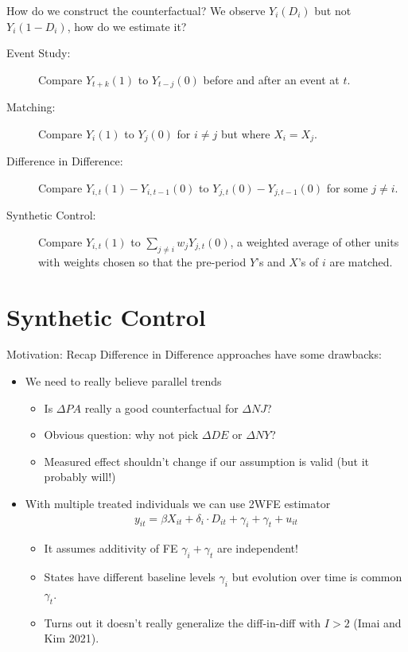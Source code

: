 \documentclass[aspectratio=169,11pt]{beamer}
\begin{document}
\begin{frame}{How do we construct the counterfactual?}
We observe $Y_i(D_i)$ but not $Y_i(1-D_i)$, how do we estimate it?\\

\begin{description}
  \item [Event Study:] Compare $Y_{t+k}(1)$ to $Y_{t-j}(0)$ before and after an event at $t$.
  \item [Matching:] Compare $Y_i(1)$ to $Y_j(0)$ for $i \neq j$ but where $X_i = X_j$.
  \item [Difference in Difference:] Compare $Y_{i,t}(1)-Y_{i,t-1}(0)$ to $Y_{j,t}(0)-Y_{j,t-1}(0)$  for some $j \neq i$.
  \item [\alert{Synthetic Control:}] Compare $Y_{i,t}(1)$ to $\sum_{j \neq i} w_j Y_{j,t}(0)$, a weighted average of other units with weights chosen so that the pre-period $Y$'s and $X$'s of $i$ are matched.

\end{description}
\end{frame}



\section{Synthetic Control}



\begin{frame}{Motivation: Recap}
Difference in Difference approaches have some drawbacks:
\begin{itemize}
\item We need to really believe \alert{parallel trends}
\begin{itemize}
\item Is $\Delta PA$ really a good counterfactual for  $\Delta NJ$?
\item Obvious question: why not pick $\Delta DE$ or $\Delta NY$?
\item Measured effect shouldn't change if our assumption is valid (but it probably will!)
\end{itemize}
\item With multiple treated individuals we can use 2WFE estimator
\begin{align*}
y_{it} = \beta X_{it} + \delta_i \cdot D_{it} +  \gamma_i + \gamma_t + u_{it}
\end{align*}
\vspace{-0.8cm}
\begin{itemize}
\item It assumes \alert{additivity} of FE $\gamma_i + \gamma_t$ are independent!
\item States have different baseline levels $\gamma_i$ but evolution over time is common $\gamma_t$.
\item Turns out it doesn't really generalize the diff-in-diff with $I > 2$ (Imai and Kim 2021).
\end{itemize}            
\end{itemize}              
\end{frame}
\end{document}
